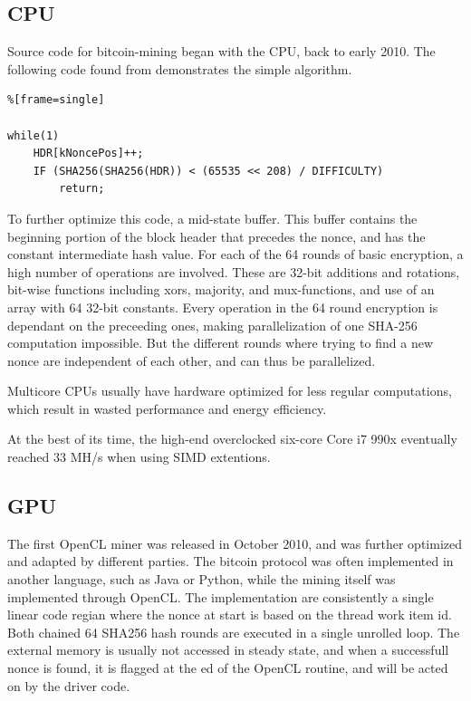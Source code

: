 \subsection{CPU}
Source code for bitcoin-mining began with the CPU, back to early 2010. 
The following code found from \cite{bitcoin github} demonstrates the simple algorithm.      
       
\begin{lstlisting}%[frame=single]  

while(1)
    HDR[kNoncePos]++;
    IF (SHA256(SHA256(HDR)) < (65535 << 208) / DIFFICULTY)
        return;
\end{lstlisting}

To further optimize this code, a mid-state buffer.
This buffer contains the beginning portion of the block header that precedes the nonce, and has the constant intermediate hash value.
For each of the 64 rounds of basic encryption, a high number of operations are involved.
These are 32-bit additions and rotations, bit-wise functions including xors, majority, and mux-functions, and use of an array with 64 32-bit constants.
Every operation in the 64 round encryption is dependant on the preceeding ones, making parallelization of one SHA-256 computation impossible.
But the different rounds where trying to find a new nonce are independent of each other, and can thus be parallelized.

Multicore CPUs usually have hardware optimized for less regular computations, which result in wasted performance and energy efficiency. \cite{bespoke-silicon}

At the best of its time, the high-end overclocked six-core Core i7 990x eventually reached 33 MH/s when using SIMD extentions.

\subsection{GPU}
The first OpenCL miner was released in October 2010, and was further optimized and adapted by different parties.
The bitcoin protocol was often implemented in another language, such as Java or Python, while the mining itself was implemented through OpenCL.
The implementation are consistently a single linear code regian where the nonce at start is based on the thread work item id.
Both chained 64 SHA256 hash rounds are executed in a single unrolled loop.
The external memory is usually not accessed in steady state, and when a successfull nonce is found, it is flagged at the ed of the OpenCL routine, and will be acted on by the driver code. 

